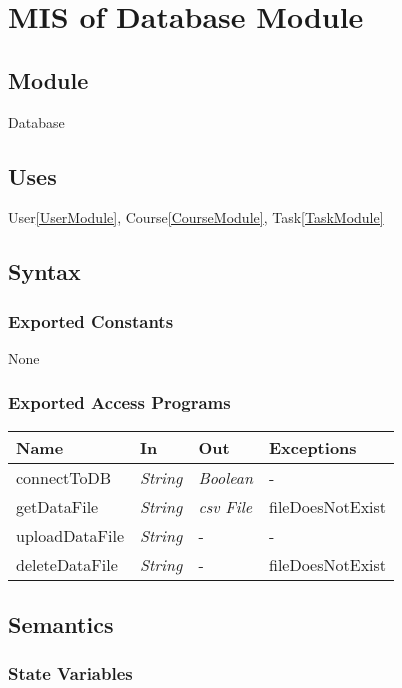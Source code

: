 \documentclass[12pt, titlepage]{article}
\begin{document}
\newpage
\section{MIS of Database Module} \label{DatabaseModule}

\subsection{Module}
Database

\subsection{Uses}
User\ref{UserModule}, Course\ref{CourseModule}, Task\ref{TaskModule}

\subsection{Syntax}

\subsubsection{Exported Constants}
None

\subsubsection{Exported Access Programs}

\begin{center}
\begin{tabular}{p{4cm} p{3cm} p{3cm} p{3cm}}
\hline
\textbf{Name} & \textbf{In} & \textbf{Out} & \textbf{Exceptions} \\
\hline
connectToDB&  \textit{String} & \textit{Boolean} & - \\
getDataFile&  \textit{String} & \textit{csv File} & fileDoesNotExist \\
uploadDataFile&  \textit{String} & - & - \\
deleteDataFile&  \textit{String} & - & fileDoesNotExist \\
\hline
\end{tabular}
\end{center}

\subsection{Semantics}

\subsubsection{State Variables}
\end{document}
